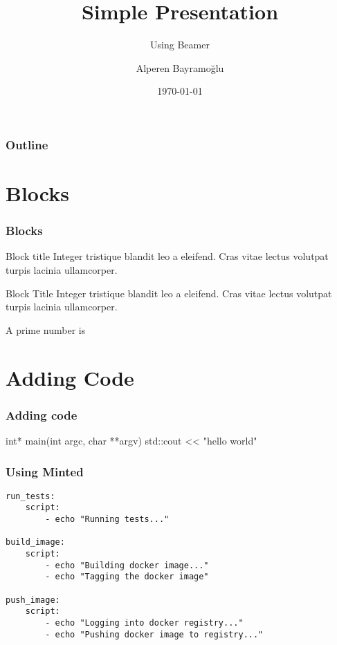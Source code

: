 \documentclass{beamer}
\title{Simple Presentation}
\subtitle{Using Beamer}
\author{Alperen Bayramoğlu}
\institute{Latex Presentation}
\date{\today}
\begin{document}
\begin{frame}
\titlepage
\end{frame}

\begin{frame}
\frametitle{Outline}
\tableofcontents
\end{frame}


\section{Blocks}
\begin{frame}
\label{first}
\frametitle{Blocks}
\begin{block}{Block title}
Integer tristique blandit leo a eleifend. Cras vitae lectus volutpat turpis lacinia ullamcorper. 
\end{block}
\end{frame}

\begin{alertblock}{Block Title}
Integer tristique blandit leo a eleifend. Cras vitae lectus volutpat turpis lacinia ullamcorper. 
\end{alertblock}

\begin{frame}
\begin{definition}
    A prime number is
\end{definition}
\end{frame}

\section{Adding Code}
\begin{frame}[fragile]
\frametitle{Adding code}
\begin{semiverbatim}
int*
main(int argc, char **argv) {
    std::cout << "hello world"    
}
\end{semiverbatim}
\end{frame}

\begin{frame}[fragile]
\frametitle{Using Minted}
\begin{verbatim}
run_tests:
    script:
        - echo "Running tests..."

build_image:
    script:
        - echo "Building docker image..."
        - echo "Tagging the docker image"

push_image:
    script:
        - echo "Logging into docker registry..."
        - echo "Pushing docker image to registry..."
\end{verbatim}
\end{frame}
\end{document}
